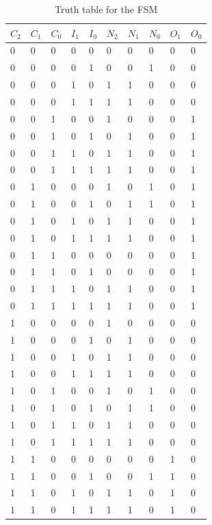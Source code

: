 \begin{table}[H]
\caption{Truth table for the FSM}
\label{tab:truthtable}
\centering
\begin{tabular}{|l|l|l|l|l|l|l|l|l|l|}
\hline
\rowcolor[HTML]{C0C0C0} 
$C_2$ & $C_1$ & $C_0$ & $I_1$ & $I_0$ & $N_2$ & $N_1$ & $N_0$ & $O_1$ & $O_0$ \\ \hline
0  & 0  & 0  & 0   & 0   & 0  & 0  & 0  & 0   & 0   \\ \hline
0  & 0  & 0  & 0   & 1   & 0  & 0  & 1  & 0   & 0   \\ \hline
0  & 0  & 0  & 1   & 0   & 1  & 1  & 0  & 0   & 0   \\ \hline
0  & 0  & 0  & 1   & 1   & 1  & 1  & 0  & 0   & 0   \\ \hline
0  & 0  & 1  & 0   & 0   & 1  & 0  & 0  & 0   & 1   \\ \hline
0  & 0  & 1  & 0   & 1   & 0  & 1  & 0  & 0   & 1   \\ \hline
0  & 0  & 1  & 1   & 0   & 1  & 1  & 0  & 0   & 1   \\ \hline
0  & 0  & 1  & 1   & 1   & 1  & 1  & 0  & 0   & 1   \\ \hline
0  & 1  & 0  & 0   & 0   & 1  & 0  & 1  & 0   & 1   \\ \hline
0  & 1  & 0  & 0   & 1   & 0  & 1  & 1  & 0   & 1   \\ \hline
0  & 1  & 0  & 1   & 0   & 1  & 1  & 0  & 0   & 1   \\ \hline
0  & 1  & 0  & 1   & 1   & 1  & 1  & 0  & 0   & 1   \\ \hline
0  & 1  & 1  & 0   & 0   & 0  & 0  & 0  & 0   & 1   \\ \hline
0  & 1  & 1  & 0   & 1   & 0  & 0  & 0  & 0   & 1   \\ \hline
0  & 1  & 1  & 1   & 0   & 1  & 1  & 0  & 0   & 1   \\ \hline
0  & 1  & 1  & 1   & 1   & 1  & 1  & 0  & 0   & 1   \\ \hline
1  & 0  & 0  & 0   & 0   & 1  & 0  & 0  & 0   & 0   \\ \hline
1  & 0  & 0  & 0   & 1   & 0  & 1  & 0  & 0   & 0   \\ \hline
1  & 0  & 0  & 1   & 0   & 1  & 1  & 0  & 0   & 0   \\ \hline
1  & 0  & 0  & 1   & 1   & 1  & 1  & 0  & 0   & 0   \\ \hline
1  & 0  & 1  & 0   & 0   & 1  & 0  & 1  & 0   & 0   \\ \hline
1  & 0  & 1  & 0   & 1   & 0  & 1  & 1  & 0   & 0   \\ \hline
1  & 0  & 1  & 1   & 0   & 1  & 1  & 0  & 0   & 0   \\ \hline
1  & 0  & 1  & 1   & 1   & 1  & 1  & 0  & 0   & 0   \\ \hline
1  & 1  & 0  & 0   & 0   & 0  & 0  & 0  & 1   & 0   \\ \hline
1  & 1  & 0  & 0   & 1   & 0  & 0  & 1  & 1   & 0   \\ \hline
1  & 1  & 0  & 1   & 0   & 1  & 1  & 0  & 1   & 0   \\ \hline
1  & 1  & 0  & 1   & 1   & 1  & 1  & 0  & 1   & 0   \\ \hline
\end{tabular}
\end{table}
